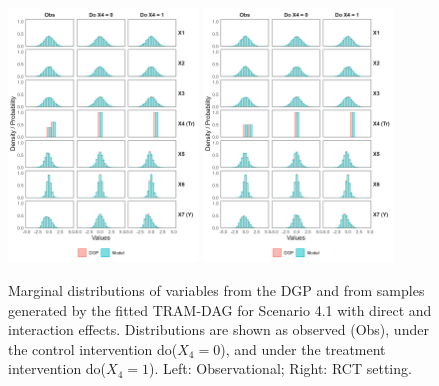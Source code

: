 \begin{figure}[htbp]
\centering
\includegraphics[width=0.45\textwidth]{img/results/observ_scenario1_sampling_distributions_vertical.png}
\includegraphics[width=0.45\textwidth]{img/results/rct_scenario1_sampling_distributions_vertical.png}
\caption{Marginal distributions of variables from the DGP and from samples generated by the fitted TRAM-DAG for Scenario 4.1 with direct and interaction effects. Distributions are shown as observed (Obs), under the control intervention do($X_4 = 0$), and under the treatment intervention do($X_4 = 1$). Left: Observational; Right: RCT setting.}
\label{fig:scenario1_sampling_distributions_vertical}
\end{figure}


